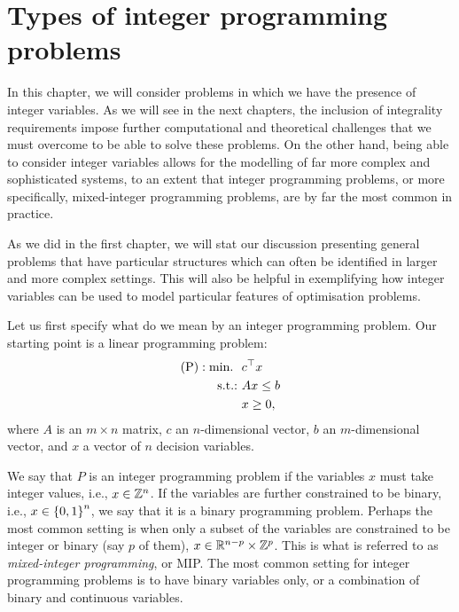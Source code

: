 \section{Types of integer programming problems}

In this chapter, we will consider problems in which we have the presence of integer variables. As we will see in the next chapters, the inclusion of integrality requirements impose further computational and theoretical challenges that we must overcome to be able to solve these problems. On the other hand, being able to consider integer variables allows for the modelling of far more complex and sophisticated systems, to an extent that integer programming problems, or more specifically, mixed-integer programming problems, are by far the most common in practice.

As we did in the first chapter, we will stat our discussion presenting general problems that have particular structures which can often be identified in larger and more complex settings. This will also be helpful in exemplifying how integer variables can be used to model particular features of optimisation problems.

Let us first specify what do we mean by an integer programming problem. Our starting point is a linear programming problem:
  \begin{align*}
	  \text{(P)} : \mathop{\text{min.~}} \ &c^\top x \\
	  \mathop{\text{s.t.:~}} & Ax \leq b \\
	  & x \geq 0,
  \end{align*}
  where $A$ is an $m \times n$ matrix, $c$ an $n$-dimensional vector, $b$ an $m$-dimensional vector, and $x$ a vector of $n$ decision variables. 
  
  We say that $P$ is an integer programming problem if the variables $x$ must take integer values, i.e., $x \in \mathbb{Z}^n$. If the variables are further constrained to be binary, i.e., $x \in \left\{ 0,1 \right \}^n$, we say that it is a binary programming problem. Perhaps the most common setting is when only a subset of the variables are constrained to be integer or binary (say $p$ of them), $x \in \mathbb{R}^{n-p} \times \mathbb{Z}^p$. This is what is referred to as \emph{mixed-integer programming}, or MIP. The most common setting for integer programming problems is to have binary variables only, or a combination of binary and continuous variables. 
   
